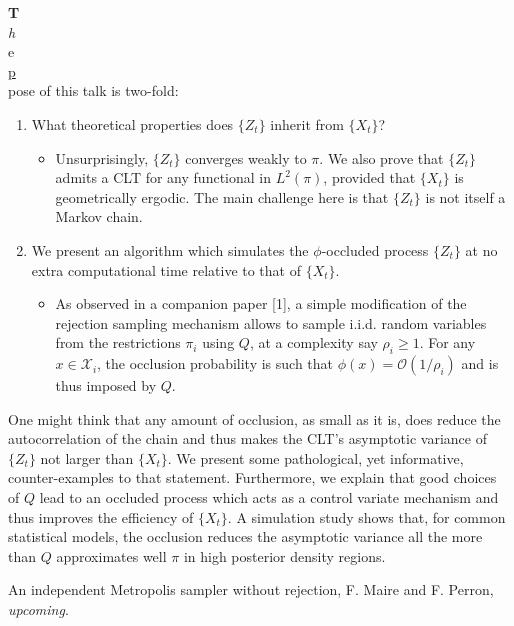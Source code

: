 \documentclass[12pt,a4paper,figuresright]{book}
\newenvironment{talk}[6]%
 {%
  \vskip 0pt\nopagebreak%
 \vskip 0pt\nopagebreak%
  \textbf{#1}\vspace{3mm}\\\nopagebreak%
  \textit{#2}\\\nopagebreak%
  #3\\\nopagebreak%
  \url{#4}\vspace{3mm}\\\nopagebreak%
  \ifthenelse{\equal{#5}{}}{}{Coauthor(s): #5\vspace{3mm}\\\nopagebreak}%
  \ifthenelse{\equal{#6}{}}{}{Special session: #6\quad \vspace{3mm}\\\nopagebreak}%
 }
 {\vspace{1cm}\\\nopagebreak}%
\begin{document}
\begin{talk}
The purpose of this talk is two-fold:
\begin{enumerate}
  \item What theoretical properties does $\{Z_t\}$ inherit from $\{X_t\}$? 
  \begin{itemize}
    \item Unsurprisingly, $\{Z_t\}$ converges weakly to $\pi$. We also prove that $\{Z_t\}$ admits a CLT for any functional in $L^2(\pi)$, provided that $\{X_t\}$ is geometrically ergodic. The main challenge here is that $\{Z_t\}$ is not itself a Markov chain.
  \end{itemize}
  \item We present an algorithm which simulates the $\phi$-occluded process $\{Z_t\}$ at no extra computational time relative to that of $\{X_t\}$.
  \begin{itemize}
  \item As observed in a companion paper [1], a simple modification of the rejection sampling mechanism allows to sample i.i.d. random variables from the restrictions $\pi_i$ using $Q$, at a complexity say $\rho_i\geq 1$. For any $x\in\mathcal{X}_i$, the occlusion probability is such that $\phi(x)=\mathcal{O}(1/\rho_i)$ and is thus imposed by $Q$.
  \end{itemize}    
\end{enumerate}

One might think that any amount of occlusion, as small as it is, does reduce the autocorrelation of the chain and thus makes the CLT's asymptotic variance of $\{Z_t\}$ not larger than $\{X_t\}$. We present some pathological, yet informative, counter-examples to that statement. Furthermore, we explain that good choices of $Q$ lead to an occluded process which acts as a control variate mechanism and thus improves the efficiency of $\{X_t\}$. A simulation study shows that, for common statistical models, the occlusion reduces the asymptotic variance all the more than $Q$ approximates well $\pi$ in high posterior density regions.


\begin{list}{[1]}
  \item An independent Metropolis sampler without rejection, F. Maire and F. Perron, \textit{upcoming}.
\end{list}



\end{talk}
\end{document}
